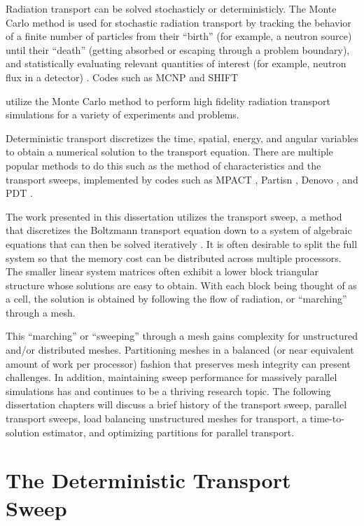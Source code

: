 Radiation transport can be solved stochasticly or deterministicly.
The Monte Carlo method is used for stochastic radiation transport by tracking the behavior of a finite number of particles from their ``birth'' (for example, a neutron source) until their ``death'' (getting absorbed or escaping through a problem boundary), and statistically evaluating relevant quantities of interest (for example, neutron flux in a detector) \cite{shultis_mc}.
Codes such as MCNP \cite{MCNP} and SHIFT {\cite{shift} utilize the Monte Carlo method to perform high fidelity radiation transport simulations for a variety of experiments and problems. 

Deterministic transport discretizes the time, spatial, energy, and angular variables to obtain a numerical solution to the transport equation.
There are multiple popular methods to do this such as the method of characteristics and the transport sweeps, implemented by codes such as MPACT \cite{mpact}, Partisn \cite{partisn}, Denovo \cite{denovo}, and PDT \cite{mpadams2013,mpadams2015}. 

The work presented in this dissertation utilizes the transport sweep, a method that discretizes the Boltzmann transport equation \cite{bell_glasstone,zweifel,davison,duderstadt} down to a system of algebraic equations that can then be solved iteratively \cite{adams_larsen}.
It is often desirable to split the full system so that the memory cost can be distributed across multiple processors. 
The smaller linear system matrices often exhibit a lower block triangular structure whose solutions are easy to obtain.
With each block being thought of as a cell, the solution is obtained by following the flow of radiation, or ``marching'' through a mesh.

This ``marching'' or ``sweeping'' through a mesh gains complexity for unstructured and/or distributed meshes. Partitioning meshes in a balanced (or near equivalent amount of work per processor) fashion that preserves mesh integrity can present challenges.
In addition, maintaining sweep performance for massively parallel simulations has and continues to be a thriving research topic.
The following dissertation chapters will discuss a brief history of the transport sweep, parallel transport sweeps, load balancing unstructured meshes for transport, a time-to-solution estimator, and optimizing partitions for parallel transport. 

\section*{The Deterministic Transport Sweep}

}
